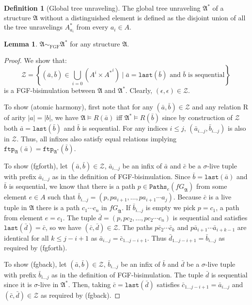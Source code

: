 \documentclass[draft]{scrartcl}
\theoremstyle{definition}
\newtheorem{definition}[theorem]{Definition}
\newtheorem{lemma}[theorem]{Lemma}
\newcommand{\last}[1]{\mathtt{last}(#1)}
\begin{document}
\begin{definition}[Global tree unraveling]
The global tree unraveling $\mathfrak{A}^*$ of a structure $\mathfrak{A}$ without a distinguished element is defined as the disjoint union of all the tree unravelings $A^*_{a_i}$ from every $a_i \in A$.
\end{definition}

\begin{lemma}
$\mathfrak{A} \sim_{\textrm{FGF}} \mathfrak{A}^*$ for any structure $\mathfrak{A}$.
\end{lemma}

\begin{proof}
We show that:
\[ \mathcal{Z} = \left\{(\bar{a}, \bar{b}) \in \bigcup_{i=0}(A^i \times {A^*}^i) \mid \text{$\bar{a} = \last{\bar{b}}$ and $\bar{b}$ is sequential}\right\} \]
is a FGF-bisimulation between $\mathfrak{A}$ and $\mathfrak{A}^*$. Clearly, $(\epsilon, \epsilon) \in \mathcal{Z}$.

To show (atomic harmony), first note that for any $(\bar{a}, \bar{b}) \in \mathcal{Z}$ and any relation R of arity $|a| = |b|$, we have $\mathfrak{A} \models R(\bar{a})$ iff $\mathfrak{A}^* \models R(\bar{b})$ since by construction of $\mathcal{Z}$ both $\bar{a} = \last{\bar{b}}$ and $\bar{b}$ is sequential. For any indices $i \leq j$, $(\bar{a}_{i\ldots{}j}, \bar{b}_{i\ldots{}j})$ is also in $\mathcal{Z}$. Thus, all infixes also satisfy equal relations implying $\mathtt{ftp}_{\mathfrak{A}}(\bar{a}) = \mathtt{ftp}_{\mathfrak{A}^*}(\bar{b})$.

To show (fgforth), let $(\bar{a}, \bar{b}) \in \mathcal{Z}$, $\bar{a}_{i\ldots{}j}$ be an infix of $\bar{a}$ and $\bar{c}$ be a $\sigma$-live tuple with prefix $\bar{a}_{i\ldots{}j}$ as in the definition of FGF-bisimulation.
Since $\bar{b} = \last{\bar{a}}$ and $\bar{b}$ is sequential, we know that there is a path $p \in \mathtt{Paths}_e(\mathit{fG}_\mathfrak{A})$ from some element $e \in A$ such that $\bar{b}_{i\ldots{}j} = (p, p a_{i+1}, \ldots, p a_{i+1} \cdots a_j)$.
Because $\bar{c}$ is a live tuple in $\mathfrak{A}$ there is a path $c_1 \cdots c_n$ in $\mathit{fG}_\mathfrak{A}$. If $\bar{b}_{i\ldots{}j}$ is empty we pick $p = c_1$, a path from element $e = c_1$.
The tuple $\bar{d} = (p, p c_2, \ldots, p c_2 \cdots c_n)$ is sequential and satisfies $\last{\bar{d}} = \bar{c}$, so we have $(\bar{c}, \bar{d}) \in \mathcal{Z}$.
The paths $p \bar{c}_2 \cdots \bar{c}_{k}$ and $p \bar{a}_{i+1} \cdots \bar{a}_{i+k-1}$ are identical for all $k \leq j-i+1$ as $\bar{a}_{i\ldots{}j} = \bar{c}_{1\ldots{}j-i+1}$.
Thus $\bar{d}_{1\ldots{}j-i+1} = \bar{b}_{i\ldots{}j}$ as required by (fgforth).

To show (fgback), let $(\bar{a}, \bar{b}) \in \mathcal{Z}$, $\bar{b}_{i\ldots{}j}$ be an infix of $\bar{b}$ and $\bar{d}$ be a $\sigma$-live tuple with prefix $\bar{b}_{i\ldots{}j}$ as in the definition of FGF-bisimulation. The tuple $\bar{d}$ is sequential since it is $\sigma$-live in $\mathfrak{A}^*$. Then, taking $\bar{c} = \last{\bar{d}}$ satisfies $\bar{c}_{1\ldots{}j-i+1} = \bar{a}_{i\ldots{}j}$ and $(\bar{c}, \bar{d}) \in \mathcal{Z}$ as required by (fgback).
\end{proof}
\end{document}

